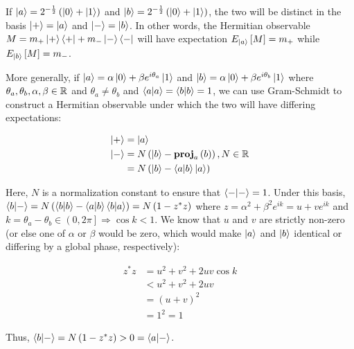 \documentclass{article}
\begin{document}
\ignorespaces
\parindent 0pt

\par If $\ket{a} = 2^{-\frac{1}{2}} \left( \ket{0} + \ket{1} \right)$ and
$\ket{b} = 2^{-\frac{1}{2}} \left( \ket{0} + \ket{1} \right)$, the two will be
distinct in the basis $\ket{+} = \ket{a}$ and $\ket{-} = \ket{b}$. In other
words, the Hermitian observable $M = m_{+} \ket{+} \bra{+} + m_{-} \ket{-}
\bra{-}$ will have expectation $E_{\ket{a}} \left[ M \right] = m_{+}$ while
$E_{\ket{b}} \left[ M \right] = m_{-}$.

\par More generally, if $\ket{a} = \alpha \ket{0} + \beta e^{i \theta_a}
\ket{1}$ and $\ket{b} = \alpha \ket{0} + \beta e^{i \theta_b} \ket{1}$ where
$\theta_a, \theta_b, \alpha, \beta \in \mathbb{R}$ and $\theta_a \ne \theta_b$ and
$\braket{a|a} = \braket{b|b} = 1$, we can use Gram-Schmidt to construct a
Hermitian observable under which the two will have differing expectations:

\begin{align}
\ket{+} &= \ket{a} \\
\ket{-} &= N \left( \ket{b} - \mathbf{proj}_a \left( b \right) \right), N \in
\mathbb{R} \\
&= N \left( \ket{b} - \braket{a|b} \ket{a} \right)
\end{align}

Here, $N$ is a normalization constant to ensure that $\braket{-|-} = 1$. Under
this basis, $\braket{b|-} = N \left( \braket{b|b} - \braket{a|b} \braket{b|a}
\right) = N \left( 1 - z^* z \right)$ where $z = \alpha^2 + \beta^2 e^{i k} = u
+ v e^{i k}$ and $k = \theta_a - \theta_b \in \left( 0, 2 \pi \right]
\Rightarrow \cos k < 1$. We know that $u$ and $v$ are strictly non-zero (or else
one of $\alpha$ or $\beta$ would be zero, which would make $\ket{a}$ and
$\ket{b}$ identical or differing by a global phase, respectively):

\begin{align}
z^* z &= u^2 + v^2 + 2 u v \cos k \\
&< u^2 + v^2 + 2 u v \\
&= \left( u + v \right)^2 \\
&= 1^2 = 1
\end{align}

Thus, $\braket{b|-} = N \left( 1 - z^* z \right) > 0 = \braket{a|-}$.
\end{document}
